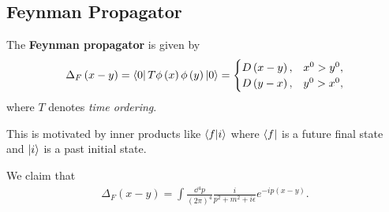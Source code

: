 
\subsection{Feynman Propagator}

\begin{definition}
    The \textbf{Feynman propagator} is given by
    \begin{align}
        \Delta_F \left( x -y \right) = \bra{0} T \phi \left( x \right) \phi \left( y \right) \ket{0} = \begin{cases}
            D \left( x -y \right), & x^{0} > y^{0},\\
            D\left( y - x \right), & y^{0} > x^{0},
        \end{cases}
    \end{align}
    where $T$ denotes \textit{time ordering}.
\end{definition}

This is motivated by inner products like $\bra{f} \ket{i}$ where $\bra{f}$ is a future final state and $\ket{i}$ is a past initial state.

\begin{claim}
    We claim that
\begin{align}
    \Delta_F \left( x -y \right) = \int \frac{\dd{^{4}p}}{\left( 2\pi \right)^{4}} \frac{i}{p^2 + m^2 + i \epsilon} e^{-i p \left( x - y \right) }
.\end{align}
\end{claim}


